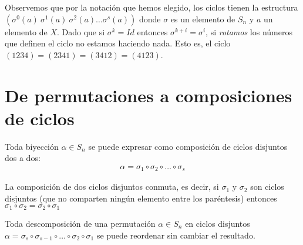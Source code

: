 Observemos que por la notación que hemos elegido, los ciclos tienen la estructura $(\sigma^0(a)\ \sigma^1(a)\ \sigma^2(a) \dots \sigma^s(a))$ donde $\sigma$ es un elemento de $S_n$ y $a$ un elemento de $X$. Dado que si $\sigma^k = Id$ entonces $\sigma^{k + i} = \sigma^i$, si \textit{rotamos} los números que definen el ciclo no estamos haciendo nada. Esto es, el ciclo $(1234) = (2341) = (3412) = (4123)$.

\section{De permutaciones a composiciones de ciclos}

\begin{pro}
	Toda biyección $\alpha \in S_n$ se puede expresar como composición de ciclos disjuntos dos a dos:
	\begin{align*}
		\alpha = \sigma_1 \circ \sigma_2 \circ \dots \circ \sigma_s
	\end{align*}
\end{pro}

\begin{pro}
	La composición de dos ciclos disjuntos conmuta, es decir, si $\sigma_1$ y $\sigma_2$ son ciclos disjuntos (que no comparten ningún elemento entre los paréntesis) entonces $\sigma_1 \circ \sigma_2 = \sigma_2 \circ \sigma_1$
\end{pro}

\begin{cor}
	Toda descomposición de una permutación $\alpha \in S_n$ en ciclos disjuntos $\alpha = \sigma_s \circ \sigma_{s-1} \circ \dots \circ \sigma_2 \circ \sigma_1$ se puede reordenar sin cambiar el resultado.
\end{cor}

